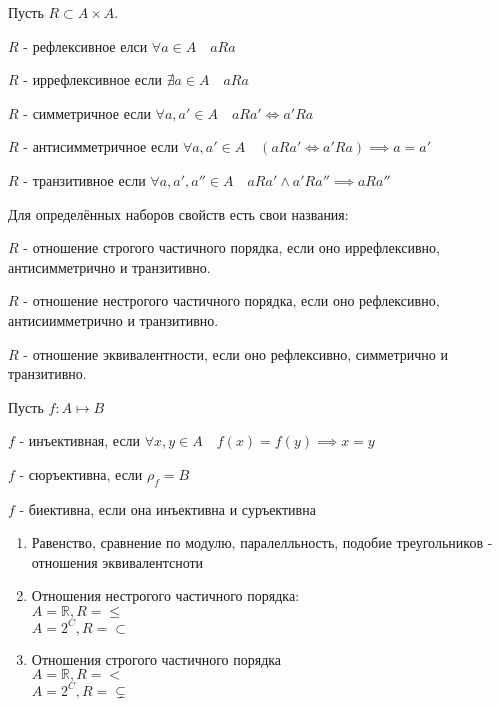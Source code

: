     \begin{properties} 
        Пусть $R \subset A \times A$.

        $R$ - рефлексивное елси $\forall{a\in A}\quad aRa$

        $R$ - иррефлексивное если $\nexists{a \in A}\quad aRa$

        $R$ - симметричное если  $\forall{a, a' \in A}\quad aRa' \iff a'Ra$

        $R$ - антисимметричное если  $\forall{a, a' \in A}\quad \left(aRa' \iff  a'Ra\right) \implies a=a'$

        $R$ - транзитивное если $\forall{a, a', a'' \in A}\quad aRa'\land a'Ra'' \implies aRa''$

        Для определённых наборов свойств есть свои названия:

        $R$ - отношение строгого частичного порядка, если оно иррефлексивно, антисимметрично и транзитивно.

        $R$ - отношение нестрогого частичного порядка, если оно рефлексивно, антисиимметрично и транзитивно.
        
        $R$ - отношение эквивалентности, если оно рефлексивно, симметрично и транзитивно.
    \end{properties}
    \begin{properties} 
        Пусть $f : A \mapsto B$

        $f$ - инъективная, если  $\forall{x, y \in A}\quad f(x) = f(y) \implies x = y$

        $f$ - сюръективна, если  $\rho_f = B$

        $f$ - биективна, если она инъективна и суръективна
    \end{properties}
    \begin{example} \thmslashn 
        \begin{enumerate}
            \item Равенство, сравнение по модулю, паралелльность, подобие треугольников - отношения эквивалентсноти
            \item Отношения нестрогого частичного порядка:\\
            $A=\mathbb{R}, R = \le$\\
            $A=2^C,  R = \subset$
            \item Отношения строгого частичного порядка\\
            $A=\mathbb{R}, R = <$\\
            $A=2^C, R = \subsetneq$
        \end{enumerate}  
    \end{example}
